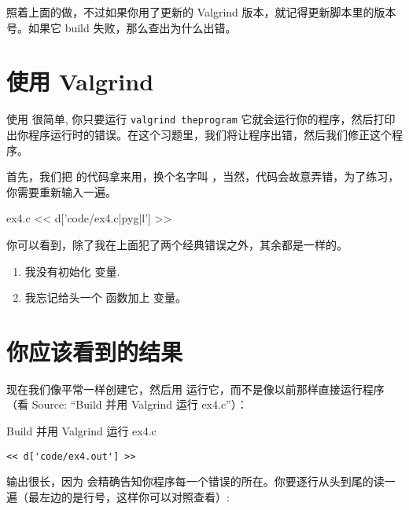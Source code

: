 照着上面的做，不过如果你用了更新的 Valgrind 版本，就记得更新脚本里的版本号。如果它 build 失败，那么查出为什么出错。

\section{使用 Valgrind}

使用  很简单, 你只要运行 \verb|valgrind theprogram| 它就会运行你的程序，然后打印出你程序运行时的错误。在这个习题里，我们将让程序出错，然后我们修正这个程序。

 首先，我们把  的代码拿来用，换个名字叫  ，当然，代码会故意弄错，为了练习，你需要重新输入一遍。

\begin{code}{ex4.c}
<< d['code/ex4.c|pyg|l'] >>
\end{code}

你可以看到，除了我在上面犯了两个经典错误之外，其余都是一样的。

\begin{enumerate}
\item 我没有初始化  变量.
\item 我忘记给头一个  函数加上  变量。
\end{enumerate}

\section{你应该看到的结果}

现在我们像平常一样创建它，然后用  运行它，而不是像以前那样直接运行程序（看 Source: “Build 并用 Valgrind 运行 ex4.c”）：

\begin{Terminal}{Build 并用 Valgrind 运行 ex4.c}
\begin{lstlisting}
<< d['code/ex4.out'] >>
\end{lstlisting}
\end{Terminal}

输出很长，因为  会精确告知你程序每一个错误的所在。你要逐行从头到尾的读一遍（最左边的是行号，这样你可以对照查看）:

